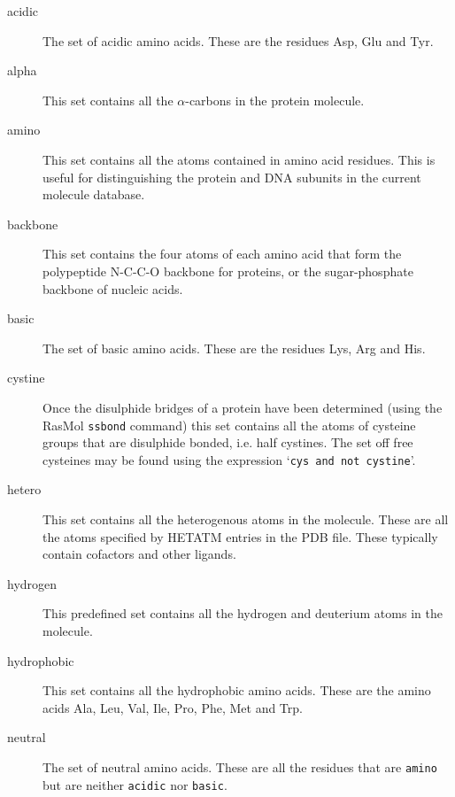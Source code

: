 \begin{description}
\item[acidic]
The set of acidic amino acids. These are the residues Asp, Glu and Tyr.

\item[alpha]
This set contains all the $\alpha$-carbons in the protein molecule.

\item[amino]
This set contains all the atoms contained in amino acid residues. This
is useful for distinguishing the protein and DNA subunits in the current
molecule database.

\item[backbone]
This set contains the four atoms of each amino acid that form the 
polypeptide N-C-C-O backbone for proteins, or the sugar-phosphate backbone
of nucleic acids.

\item[basic]
The set of basic amino acids. These are the residues Lys, Arg and His.

\item[cystine]
Once the disulphide bridges of a protein have been determined (using the
RasMol {\tt ssbond} command) this set contains all the atoms of cysteine
groups that are disulphide bonded, i.e. half cystines. The set off free
cysteines may be found using the expression `{\tt cys and not cystine}'.

\item[hetero]
This set contains all the heterogenous atoms in the molecule. These are all
the atoms specified by HETATM entries in the PDB file. These typically 
contain cofactors and other ligands.

\item[hydrogen]
This predefined set contains all the hydrogen and deuterium atoms in the 
molecule. 

\item[hydrophobic]
This set contains all the hydrophobic amino acids. These are the amino acids
Ala, Leu, Val, Ile, Pro, Phe, Met and Trp.

\item[neutral]
The set of neutral amino acids. These are all the residues that are
{\tt amino} but are neither {\tt acidic} nor {\tt basic}.


\end{description}
